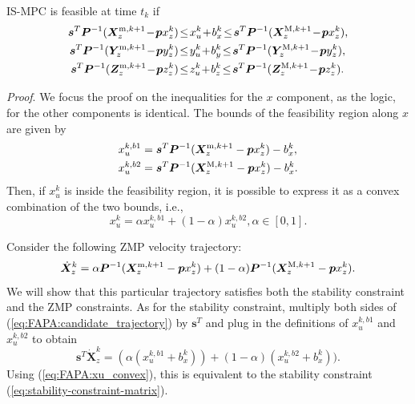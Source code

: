 \begin{proposition}
\label{prop:feasibility}
IS-MPC is feasible at time $t_k$ if
\begin{align}
\label{eq:FAPA:mpc-feasibility-constraint}
\bm{s}^T \bm{P}^{-1} (\bm{X}_z^{{\rm m}, k+1} \!-\! \bm{p} x_z^k)  \!&\le\! x_u^k \!+\! b_x^k \!\le\! \bm{s}^T \bm{P}^{-1} (\bm{X}_z^{{\rm M}, k+1} \!-\! \bm{p} x_z^k),
\nonumber\\
\bm{s}^T \bm{P}^{-1} (\bm{Y}_z^{{\rm m}, k+1} \!-\! \bm{p} y_z^k)  \!&\le\! y_u^k \!+\! b_y^k \!\le\! \bm{s}^T \bm{P}^{-1} (\bm{Y}_z^{{\rm M}, k+1} \!-\! \bm{p} y_z^k),
\nonumber\\
\bm{s}^T \bm{P}^{-1} (\bm{Z}_z^{{\rm m}, k+1} \!-\! \bm{p} z_z^k)  \!&\le\! z_u^k \!+\! b_z^k \!\le\! \bm{s}^T \bm{P}^{-1} (\bm{Z}_z^{{\rm M}, k+1} \!-\! \bm{p} z_z^k).
\end{align}
\end{proposition}
{\em Proof}.
We focus the proof on the inequalities for the $x$ component, as the logic, for
the other components is identical. The bounds of the feasibility region along
$x$ are given by
\begin{align*}
x_u^{k,b1} &= \bm{s}^T \bm{P}^{-1} (\bm{X}_z^{{\rm m}, k+1} - \bm{p} x_z^k) - b_x^k, \\
x_u^{k,b2} &= \bm{s}^T \bm{P}^{-1} (\bm{X}_z^{{\rm M}, k+1} - \bm{p} x_z^k) - b_x^k.
\end{align*}
Then, if $x_u^k$ is inside the feasibility region, it is possible to express
it as a convex combination of the two bounds, i.e.,
\begin{equation}\label{eq:FAPA:xu_convex}
x_u^k = \alpha x_u^{k,b1} + (1-\alpha)x_u^{k,b2}, \alpha \in [0, 1].
\end{equation}

Consider the following ZMP velocity trajectory:
\begin{equation}\label{eq:FAPA:candidate_trajectory}
\dot{\bm{X}}_z^k = \alpha \bm{P}^{-1}(\bm{X}_z^{{\rm m}, k+1} - \bm{p} x_z^k) + (1-\alpha)\bm{P}^{-1}(\bm{X}_z^{{\rm M}, k+1} - \bm{p} x_z^k).
\end{equation}
We will show that this particular trajectory satisfies both the stability
constraint and the ZMP constraints. As for the stability constraint, multiply
both sides of (\ref{eq:FAPA:candidate_trajectory}) by $\bm{s}^T$
and plug in the definitions of $x_u^{k,b1}$ and $x_u^{k,b2}$ to obtain
\begin{equation*}
\bm{s}^T\dot{\bm X}_z^k = (\alpha (x_u^{k,b1} + b^k_x)) + (1-\alpha)(x_u^{k,b2} + b^k_x)).
\end{equation*}
Using (\ref{eq:FAPA:xu_convex}), this is equivalent to the stability
constraint (\ref{eq:stability-constraint-matrix}).

